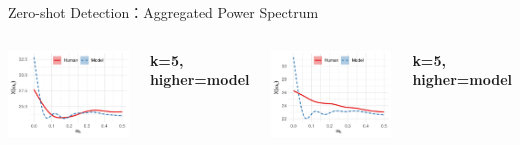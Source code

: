 \documentclass[serif]{beamer}
\begin{document}
\begin{frame}{Zero-shot Detection：Aggregated Power Spectrum}
\begin{columns}[t]
    \centering
    \includegraphics[width=\linewidth]{images/en_essay_aggregated.pdf}
    
    {\scriptsize \textbf{k=5, higher=model}}

    \centering
    \includegraphics[width=\linewidth]{images/en_reuter_aggregated.pdf}
    
    {\scriptsize \textbf{k=5, higher=model}}


\end{columns}
\end{frame}
\end{document}
